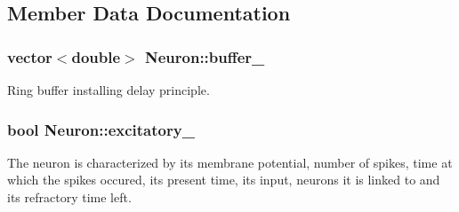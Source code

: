 \subsection{Member Data Documentation}
\hypertarget{classNeuron_ab2abc06234893064464b0c5ac4374ada}{
\subsubsection[{buffer\-\_\-}]{\setlength{\rightskip}{0pt plus 5cm}vector$<$double$>$ Neuron\-::buffer\-\_\-\hspace{0.3cm}{\ttfamily [private]}}}\label{classNeuron_ab2abc06234893064464b0c5ac4374ada}
Ring buffer installing delay principle. \hypertarget{classNeuron_a4450ff3bd20d2e5b4f74746068b8d461}{
\subsubsection[{excitatory\-\_\-}]{\setlength{\rightskip}{0pt plus 5cm}bool Neuron\-::excitatory\-\_\-\hspace{0.3cm}{\ttfamily [private]}}}\label{classNeuron_a4450ff3bd20d2e5b4f74746068b8d461}
The neuron is characterized by its membrane potential, number of spikes, time at which the spikes occured, its present time, its input, neurons it is linked to and its refractory time left.

